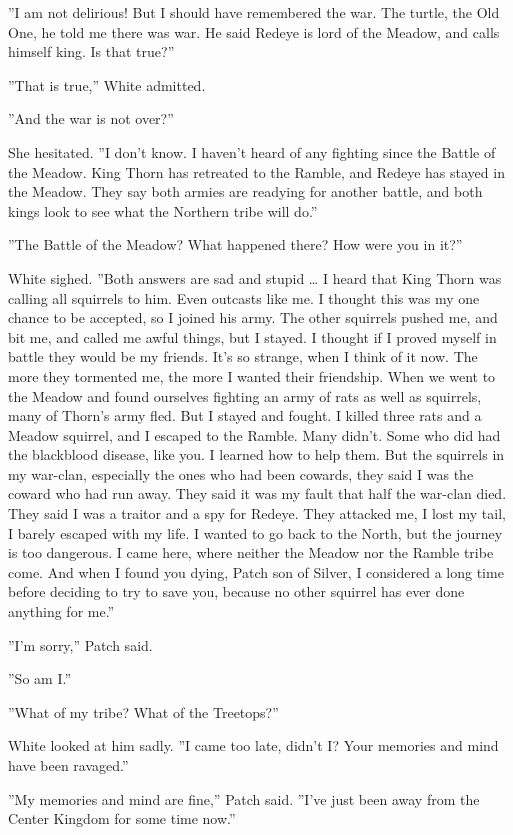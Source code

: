 \documentclass[12pt]{book}
\begin{document}
''I am not delirious! But I should have remembered the war. The turtle, the Old One, he told me there was war. He said Redeye is lord of the Meadow, and calls himself king. Is that true?''

''That is true,'' White admitted.

''And the war is not over?''

She hesitated. ''I don't know. I haven't heard of any fighting since the Battle of the Meadow. King Thorn has retreated to the Ramble, and Redeye has stayed in the Meadow. They say both armies are readying for another battle, and both kings look to see what the Northern tribe will do.''

''The Battle of the Meadow? What happened there? How were you in it?''

White sighed. ''Both answers are sad and stupid \ldots{}
I heard that King Thorn was calling all squirrels to him. Even outcasts like me. I thought this was my one chance to be accepted, so I joined his army. The other squirrels pushed me, and bit me, and called me awful things, but I stayed. I thought if I proved myself in battle they would be my friends. It's so strange, when I think of it now. The more they tormented me, the more I wanted their friendship. When we went to the Meadow and found ourselves fighting an army of rats as well as squirrels, many of Thorn's army fled. But I stayed and fought. I killed three rats and a Meadow squirrel, and I escaped to the Ramble. Many didn't. Some who did had the blackblood disease, like you. I learned how to help them. But the squirrels in my war-clan, especially the ones who had been cowards, they said I was the coward who had run away. They said it was my fault that half the war-clan died. They said I was a traitor and a spy for Redeye. They attacked me, I lost my tail, I barely escaped with my life. I wanted to go back to the North, but the journey is too dangerous. I came here, where neither the Meadow nor the Ramble tribe come. And when I found you dying, Patch son of Silver, I considered a long time before deciding to try to save you, because no other squirrel has ever done anything for me.''

''I'm sorry,'' Patch said.

''So am I.''

''What of my tribe? What of the Treetops?''

White looked at him sadly. ''I came too late, didn't I? Your memories and mind have been ravaged.''

''My memories and mind are fine,'' Patch said. ''I've just been away from the Center Kingdom for some time now.''
\end{document}
